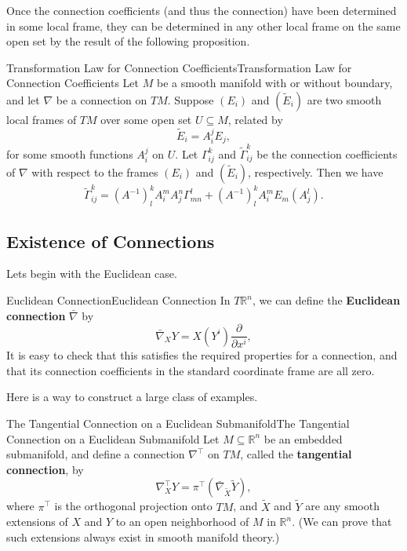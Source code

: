 \documentclass[../main.tex]{subfiles}
\begin{document}
Once the connection coefficients (and thus the connection) have been determined in some local frame, they can be determined in any other local frame on the same open set by the result of the following proposition.

\begin{proposition}{Transformation Law for Connection Coefficients}{Transformation Law for Connection Coefficients}
	Let $M$ be a smooth manifold with or without boundary, and let $\nabla$ be a connection on $TM$. Suppose $(E_i)$ and $(\tilde{E}_i)$ are two smooth local frames of $TM$ over some open set $U \subseteq M$, related by
	\begin{equation}
		\tilde{E}_i = A_i^j E_j,
	\end{equation}
	for some smooth functions $A_i^j$ on $U$. Let $\Gamma_{ij}^k$ and $\tilde{\Gamma}_{ij}^k$ be the connection coefficients of $\nabla$ with respect to the frames $(E_i)$ and $(\tilde{E}_i)$, respectively. Then we have
	\begin{equation}
		\tilde{\Gamma}_{ij}^k = (A^{-1})_l^k A_i^m A_j^n \Gamma_{mn}^l + (A^{-1})_l^k A_i^m E_m(A_j^l).
	\end{equation}
\end{proposition}

\subsection{Existence of Connections}
Lets begin with the Euclidean case.
\begin{example}{Euclidean Connection}{Euclidean Connection}
	In $T \mathbb{R}^n$, we can define the \textbf{Euclidean connection} $\bar{\nabla}$ by
	\begin{equation}
		\bar{\nabla}_X Y = X(Y^i) \frac{\partial}{\partial x^i},
	\end{equation}
	It is easy to check that this satisfies the required properties for a connection, and that its connection coefficients in the standard coordinate frame are all zero.
\end{example}

Here is a way to construct a large class of examples.
\begin{example}{The Tangential Connection on a Euclidean Submanifold}{The Tangential Connection on a Euclidean Submanifold}
	Let $M \subseteq \mathbb{R}^n$ be an embedded submanifold, and define a connection $\nabla^{\top}$ on $TM$, called the \textbf{tangential connection}, by
	\begin{equation}
		\nabla^{\top}_X Y = \pi^{\top}(\bar{\nabla}_{\tilde{X}} \tilde{Y}),
	\end{equation}
	where $\pi^{\top}$ is the orthogonal projection onto $TM$, and $\tilde{X}$ and $\tilde{Y}$ are any smooth extensions of $X$ and $Y$ to an open neighborhood of $M$ in $\mathbb{R}^n$. (We can prove that such extensions always exist in smooth manifold theory.)
\end{example}
\end{document}
